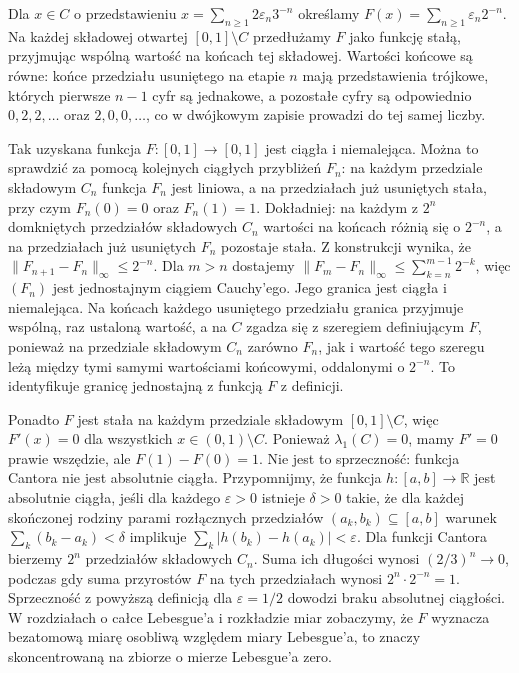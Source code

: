 \begin{przyklad}
\label{ex:cantor-function}
Dla $x\in C$ o przedstawieniu
$x=\sum_{n\ge1}2\varepsilon_n3^{-n}$ określamy
$F(x)=\sum_{n\ge1}\varepsilon_n2^{-n}$.
Na każdej składowej otwartej $[0,1]\setminus C$
przedłużamy $F$ jako funkcję stałą, przyjmując
wspólną wartość na końcach tej składowej.
Wartości końcowe są równe: końce przedziału
usuniętego na etapie $n$ mają przedstawienia
trójkowe, których pierwsze $n-1$ cyfr są jednakowe,
a pozostałe cyfry są odpowiednio $0,2,2,\ldots$
oraz $2,0,0,\ldots$, co w dwójkowym zapisie
prowadzi do tej samej liczby.

Tak uzyskana funkcja $F:[0,1]\to[0,1]$
jest ciągła i niemalejąca. Można to sprawdzić za
pomocą kolejnych ciągłych przybliżeń $F_n$:
na każdym przedziale składowym $C_n$ funkcja $F_n$
jest liniowa, a na przedziałach już usuniętych
stała, przy czym $F_n(0)=0$ oraz $F_n(1)=1$.
Dokładniej: na każdym z $2^n$ domkniętych przedziałów
składowych $C_n$ wartości na końcach różnią się o
$2^{-n}$, a na przedziałach już usuniętych $F_n$
pozostaje stała. Z konstrukcji wynika, że
$\|F_{n+1}-F_n\|_\infty\le 2^{-n}$.
Dla $m>n$ dostajemy
$\|F_m-F_n\|_\infty\le\sum_{k=n}^{m-1}2^{-k}$,
więc $(F_n)$ jest jednostajnym ciągiem Cauchy'ego.
Jego granica jest ciągła i niemalejąca. Na końcach
każdego usuniętego przedziału granica przyjmuje
wspólną, raz ustaloną wartość, a na $C$ zgadza się
z szeregiem definiującym $F$, ponieważ na przedziale
składowym $C_n$ zarówno $F_n$, jak i wartość tego
szeregu leżą między tymi samymi wartościami końcowymi,
oddalonymi o $2^{-n}$. To identyfikuje granicę
jednostajną z funkcją $F$ z definicji.

Ponadto $F$ jest stała na każdym przedziale
składowym $[0,1]\setminus C$, więc $F'(x)=0$
dla wszystkich $x\in(0,1)\setminus C$.
Ponieważ $\lambda_1(C)=0$, mamy $F'=0$
prawie wszędzie, ale $F(1)-F(0)=1$.
Nie jest to sprzeczność: funkcja Cantora nie jest
absolutnie ciągła. Przypomnijmy, że funkcja
$h:[a,b]\to\mathbb R$ jest absolutnie ciągła, jeśli
dla każdego $\varepsilon>0$ istnieje $\delta>0$
takie, że dla każdej skończonej rodziny parami
rozłącznych przedziałów $(a_k,b_k)\subseteq[a,b]$
warunek $\sum_k(b_k-a_k)<\delta$ implikuje
$\sum_k|h(b_k)-h(a_k)|<\varepsilon$.
Dla funkcji Cantora bierzemy $2^n$ przedziałów
składowych $C_n$. Suma ich długości wynosi
$(2/3)^n\to0$, podczas gdy suma przyrostów $F$
na tych przedziałach wynosi
$2^n\cdot2^{-n}=1$. Sprzeczność z powyższą definicją
dla $\varepsilon=1/2$ dowodzi braku absolutnej ciągłości.
W rozdziałach o całce Lebesgue'a i rozkładzie miar
zobaczymy, że $F$ wyznacza bezatomową miarę
osobliwą względem miary Lebesgue'a, to znaczy
skoncentrowaną na zbiorze o mierze Lebesgue'a zero.
\end{przyklad}

